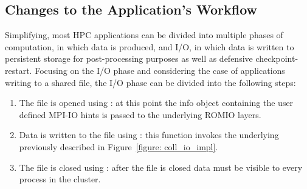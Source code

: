 
\subsection{Changes to the Application's Workflow}
\label{subsec: new-workflow}
Simplifying, most HPC applications can be divided into multiple phases of computation, in which data is produced, and I/O, in which data is written to persistent storage for post-processing purposes as well as defensive checkpoint-restart. Focusing on the I/O phase and considering the case of applications writing to a shared file, the I/O phase can be divided into the following steps:
\begin{enumerate}
\item The file is opened using : at this point the info object containing the user defined MPI-IO hints is passed to the underlying ROMIO layers.
\item Data is written to the file using : this function invokes the underlying  previously described in Figure~\ref{figure: coll_io_impl}.
\item The file is closed using : after the file is closed data must be visible to every process in the cluster. 
\end{enumerate}

